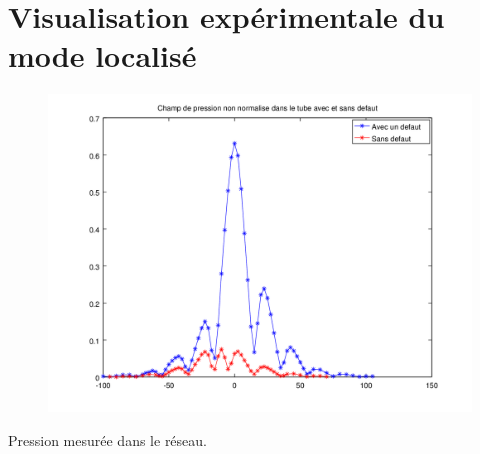 \documentclass[12pt,xcolor=x11names,compress, notes=show]{beamer}%
\begin{document}
\section{Visualisation expérimentale du mode localisé}

\begin{frame}{\insertsectionhead}

\begin{figure}
\centering
\includegraphics[scale=0.4]{non_norm_lin.png}
\end{figure}

\begin{center}
	Pression mesurée dans le réseau.
\end{center}

\end{frame}
\end{document}
